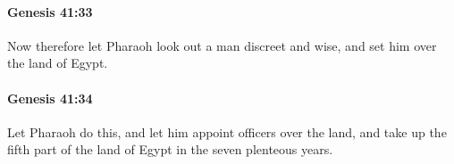 		\paragraph{Genesis 41:33} %
			\label{GENESIS-41-33}

			Now therefore let Pharaoh look out a man discreet and wise, and set him over the land of Egypt.


		\paragraph{Genesis 41:34} %
			\label{GENESIS-41-34}

			Let Pharaoh do this, and let him appoint officers over the land, and take up the fifth part of the land of Egypt in the seven plenteous years.


